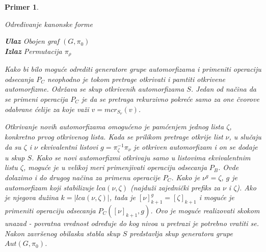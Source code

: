 \documentclass[12pt,oneside]{memoir}
\newtheorem{example}{Primer}
\theoremstyle{definition}
\begin{document}
\begin{example}
  \begin{algorithm}[H]
	  \caption{Određivanje kanonske forme}
	  \textbf{Ulaz} Obojen graf $(G, \pi_0)$\\
	  \textbf{Izlaz} Permutacija $\pi_\rho$
	  \begin{algorithmic}[1]
		  	\State \Return
		  \EndIf
		  \EndFor
				\State {$\rho \gets \nu$}
			\EndIf
		  \EndIf
		  \EndProcedure
		  \State {$\rho \gets ()$}
	  \end{algorithmic}
  \end{algorithm}

  Kako bi bilo moguće odrediti generatore grupe automorfizama i primeniti
  operaciju odsecanja $P_C$ neophodno je tokom pretrage otkrivati i pamtiti
  otkrivene automorfizme. Održava se skup otkrivenih automorfizama $S$. Jedan
  od načina da se primeni operacija $P_C$ je da se pretraga rekurzivno pokreće
  samo za one čvorove odabrane ćelije za koje važi $v = mcr_{S_\nu}(v)$.

  Otkrivanje novih automorfizama omogućeno je pamćenjem jednog lista $\zeta$,
  konkretno prvog otkrivenog lista. Kada se prilikom pretrage otkrije list
  $\nu$, u slučaju da su $\zeta$ i $\nu$ ekvivalentni listovi $g =
  \pi_\zeta^{-1} \pi_\nu$ je otkriven automorfizam i on se dodaje u skup $S$.
  Kako se novi automorfizmi otkrivaju samo u listovima ekvivalentnim listu
  $\zeta$, moguće je u velikoj meri primenjivati operaciju odsecanja $P_B$.
  Ovde dolazimo i do drugog načina za primenu operacije $P_C$. Kako je $\nu^g =
  \zeta$, $g$ je automorfizam koji stabilizuje $lca(\nu, \zeta)$ (najduži
  zajednički prefiks za $\nu$ i $\zeta$). Ako je njegova dužina $k = |lca(\nu,
  \zeta)|$, tada je $[\nu]_{k+1}^g = [\zeta]_{k+1}$ i moguće je primeniti
  operaciju odsecanja $P_C([\nu]_{k+1}, g)$. Ovo je moguće realizovati skokom
  unazad - povratna vrednost određuje do kog nivoa u pretrazi je potrebno
  vratiti se. Nakon završenog obilaska stabla skup $S$ predstavlja skup
  generatora grupe $Aut(G, \pi_0)$.


\end{example}
\end{document}
